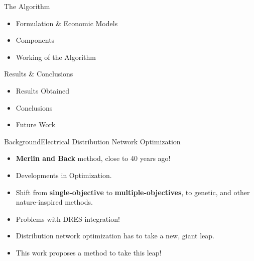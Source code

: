 \documentclass[xcolor=svgnames,aspectratio=32,8pt]{beamer}
\begin{document}
\begin{frame}
  \begin{minipage}[!h]{0.5\textwidth}
    \begin{alertblock}{The Algorithm}
    \begin{itemize}
    \item Formulation \& Economic Models
    \item Components
    \item Working of the Algorithm
    \end{itemize}
    \end{alertblock}
  \pause
  \end{minipage}%
  \begin{minipage}[!h]{0.5\textwidth}
    \begin{exampleblock}{Results \& Conclusions}
    \begin{itemize}
    \item Results Obtained
    \item Conclusions
    \item Future Work
    \end{itemize}
    \end{exampleblock}
  \end{minipage}

\end{frame}


\begin{frame}
  {Background}{Electrical Distribution Network Optimization}

  \begin{itemize}
    \item \textbf{Merlin and Back} method, close to 40 years ago! \pause
    \vspace{0.2cm}
    \item Developments in Optimization. \pause
    \vspace{0.2cm}
    \item Shift from \textbf{single-objective} to \textbf{multiple-objectives}, to genetic, and other nature-inspired methods. \pause
    \vspace{0.2cm}
    \item Problems with DRES integration! \pause
    \vspace{0.2cm}
    \item Distribution network optimization has to take a new, giant leap. \pause
    \vspace{0.2cm}
    \item This work proposes a method to take this leap!
  \end{itemize}

\end{frame}
\end{document}
